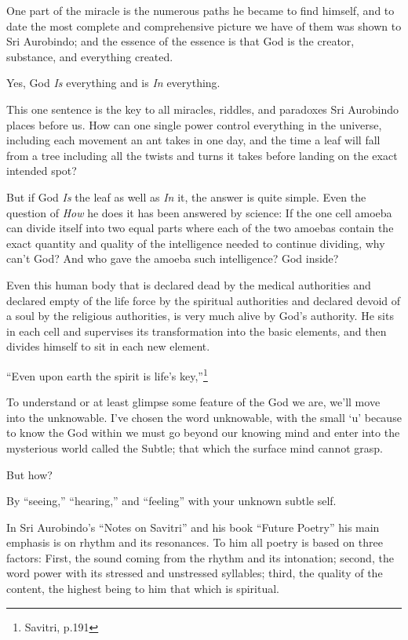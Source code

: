 \documentclass[12pt,a4paper]{book}
\begin{document}
One part of the miracle is the numerous paths he became to find
himself, and to date the most complete and comprehensive picture we
have of them was shown to Sri Aurobindo; and the essence of the
essence is that God is the creator, substance, and everything created.

\noindent Yes, God \emph{Is} everything and is \emph{In} everything.

This one sentence is the key to all miracles, riddles, and paradoxes
Sri Aurobindo places before us. How can one single power control
everything in the universe, including each movement an ant takes in
one day, and the time a leaf will fall from a tree including all the
twists and turns it takes before landing on the exact intended spot?

But if God \emph{Is} the leaf as well as \emph{In} it, the answer is
quite simple. Even the question of \emph{How} he does it has been
answered by science: If the one cell amoeba can divide itself into two
equal parts where each of the two amoebas contain the exact quantity
and quality of the intelligence needed to continue dividing, why can't
God? And who gave the amoeba such intelligence? God inside?

Even this human body that is declared dead by the medical authorities
and declared empty of the life force by the spiritual authorities and
declared devoid of a soul by the religious authorities, is very much
alive by God's authority. He sits in each cell and supervises its
transformation into the basic elements, and then divides himself to
sit in each new element.

``Even upon earth the spirit is life's key,''\footnote{Savitri, p.191}

To understand or at least glimpse some feature of the God we are,
we'll move into the unknowable. I've chosen the word unknowable,
with the small `u' because to know the God within we must go beyond
our knowing mind and enter into the mysterious world called the
Subtle; that which the surface mind cannot grasp.

\noindent But how?

\noindent By ``seeing,'' ``hearing,'' and ``feeling'' with your unknown
subtle self.

In Sri Aurobindo's ``Notes on Savitri'' and his book ``Future Poetry''
his main emphasis is on rhythm and its resonances. To him all poetry
is based on three factors: First, the sound coming from the rhythm and
its intonation; second, the word power with its stressed and
unstressed syllables; third, the quality of the content, the highest
being to him that which is spiritual.
\end{document}
